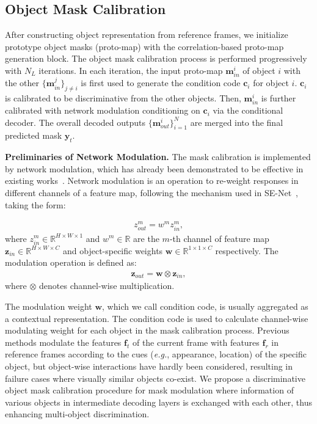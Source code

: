\documentclass[sigconf]{acmart}
\begin{document}
\subsection{Object Mask Calibration}  
\label{sec:method/relational_modulation_network}

After constructing object representation from reference frames, we initialize prototype object masks (proto-map) with the correlation-based proto-map generation block. The object mask calibration process is performed progressively with $N_L$ iterations. In each iteration, the input proto-map $\mathbf{m}_{in}^i$ of object $i$ with the other $\{\mathbf{m}_{in}^{j}\}_{j\neq i}$ is first used to generate the condition code $\mathbf{c}_i$ for object $i$. $\mathbf{c}_i$ is calibrated to be discriminative from the other objects. Then, $\mathbf{m}_{in}^i$ is further calibrated with network modulation conditioning on $\mathbf{c}_i$ via the conditional decoder. The overall decoded outputs $ \{\mathbf{m}_{out}^i \}_{i=1}^N$ are merged into the final predicted mask $\mathbf{y}_t$.

\noindent\textbf{Preliminaries of Network Modulation.}
The mask calibration is implemented by network modulation, which has already been demonstrated to be effective in existing works~\cite{Yang2018osmn,yang2020collaborative,yang2021collaborative}. Network modulation is an operation to re-weight responses in different channels of a feature map, following the mechanism used in SE-Net~\cite{hu_senet_cvpr2018}, taking the form: 

\begin{eqnarray}
\label{eq:modulation}
    {z}^m_{out} = {w}^m {z}^m_{in} ,
\end{eqnarray}
where ${z}^m_{in} \in \mathbb{R}^{H \times W \times 1} $ and ${w}^m \in \mathbb{R}$ are the $m$-th channel of feature map $\mathbf{z}_{in} \in \mathbb{R}^{H \times W \times C} $ and object-specific weights $\mathbf{w}  \in \mathbb{R}^{1 \times 1 \times C}$ respectively. The modulation operation is defined as:
\begin{eqnarray}
    \mathbf{z}_{out} = \mathbf{w} \otimes \mathbf{z}_{in},
\end{eqnarray}
where $\otimes$ denotes channel-wise multiplication.

The modulation weight $\mathbf{w}$, which we call condition code, is usually aggregated as a contextual representation. The condition code is used to calculate channel-wise modulating weight for each object in the mask calibration process. 
Previous methods modulate the features $\mathbf{f}_t$ of the current frame with
features $\mathbf{f}_r$ in reference frames according to the cues (\textit{e.g.}, appearance, location) of the specific object, but object-wise interactions have hardly been considered, resulting in failure cases where visually similar objects co-exist.
We propose a discriminative object mask calibration procedure for mask modulation where information of various objects in intermediate decoding layers is exchanged with each other, thus enhancing multi-object discrimination. 
\end{document}
